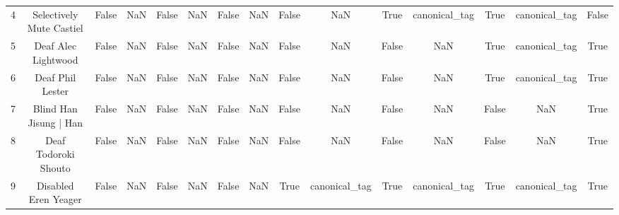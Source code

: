 \begin{table}[h!]
{\begin{tabular}{|c|c|c|c|c|c|c|c|c|c|c|c|c|c|c|}
          4 &                          Selectively Mute Castiel &                          False &                       NaN &                          False &                       NaN &                          False &                       NaN &                          False &                       NaN &                           True &             canonical\_tag &                           True &             canonical\_tag &                          False \\
          5 &                               Deaf Alec Lightwood &                          False &                       NaN &                          False &                       NaN &                          False &                       NaN &                          False &                       NaN &                          False &                       NaN &                           True &             canonical\_tag &                           True \\
          6 &                                  Deaf Phil Lester &                          False &                       NaN &                          False &                       NaN &                          False &                       NaN &                          False &                       NaN &                          False &                       NaN &                           True &             canonical\_tag &                           True \\
          7 &                            Blind Han Jisung | Han &                          False &                       NaN &                          False &                       NaN &                          False &                       NaN &                          False &                       NaN &                          False &                       NaN &                          False &                       NaN &                           True \\
          8 &                              Deaf Todoroki Shouto &                          False &                       NaN &                          False &                       NaN &                          False &                       NaN &                          False &                       NaN &                          False &                       NaN &                          False &                       NaN &                           True \\
          9 &                              Disabled Eren Yeager &                          False &                       NaN &                          False &                       NaN &                          False &                       NaN &                           True &             canonical\_tag &                           True &             canonical\_tag &                           True &             canonical\_tag &                           True \\

\end{tabular}}
\end{table}
